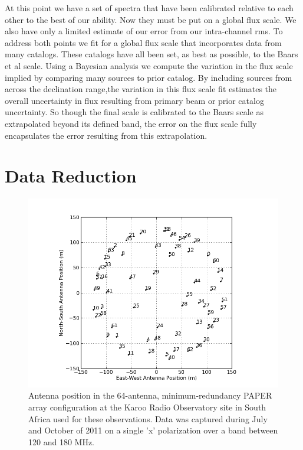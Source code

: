 \documentclass[preprint]{aastex}
\begin{document}
At this point we have a set of spectra that have been calibrated relative to each other to the best of our ability. Now 
they must be put on a global flux scale. We also have only a limited estimate of our error from our intra-channel
rms.  To address both points we fit for a global flux scale that incorporates data from many catalogs. These catalogs
have all been set, as best as possible, to the Baars et al scale.  Using a Bayesian analysis we compute the 
variation in the flux scale implied by comparing many sources to prior catalog. By including sources from across
the declination range,the variation in this flux scale fit estimates the overall uncertainty in flux resulting from primary beam 
or prior catalog uncertainty.  So though the final scale is calibrated to the Baars scale as extrapolated beyond its
defined band, the error on the flux scale fully encapsulates the error resulting from this extrapolation.

 
 \section{Data Reduction}
 \label{sec:Observations}


\begin{figure}\centering
\includegraphics[width=0.85\columnwidth]{plots/antpos.png}
\caption{Antenna position in the 64-antenna, minimum-redundancy PAPER array configuration at the Karoo Radio Observatory site in South Africa used for these observations.
Data was captured during July and October of 2011 on a single 'x' polarization over a band between 120 and 180 MHz.
}\label{fig:antpos}
\end{figure}
\end{document}
